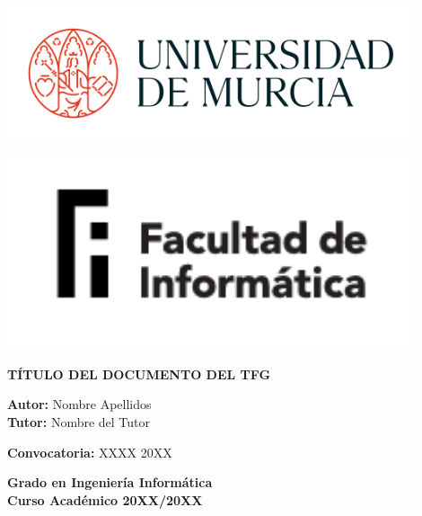 \documentclass[12pt, a4paper]{article}
\begin{document}
\begin{titlepage}
\centering

\begin{minipage}{0.4\textwidth}
    \centering
    \includegraphics[width=0.9\textwidth]{images/logo-umu.png}
\end{minipage}
\hfill
\begin{minipage}{0.4\textwidth}
    \centering
    \includegraphics[width=0.9\textwidth]{images/logo-fac.png}
\end{minipage}

\vfill %

{\Huge \textbf{TÍTULO DEL DOCUMENTO DEL TFG}\\}
\vspace{1.5cm}

{\large \textbf{Autor:} Nombre Apellidos\\}
\vspace{0.5cm}
{\large \textbf{Tutor:} Nombre del Tutor\\}
\vspace{2cm}

{\large \textbf{Convocatoria:} XXXX 20XX\\}
\vspace{1cm}

{\large \textbf{Grado en Ingeniería Informática}\\}
\vspace{0.5cm}
{\large \textbf{Curso Académico 20XX/20XX}\\}

\vfill %

\end{titlepage}
\end{document}
